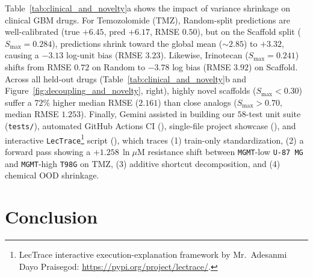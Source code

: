 \documentclass{article}
\begin{document}
Table~\ref{tab:clinical_and_novelty}a shows the impact of variance shrinkage on clinical GBM drugs. For Temozolomide (TMZ), Random-split predictions are well-calibrated (true $+6.45$, pred $+6.17$, RMSE $0.50$), but on the Scaffold split ($S_{\max} = 0.284$), predictions shrink toward the global mean ($\sim 2.85$) to $+3.32$, causing a $-3.13$ log-unit bias (RMSE $3.23$). Likewise, Irinotecan ($S_{\max} = 0.241$) shifts from RMSE $0.72$ on Random to $-3.78$ log bias (RMSE $3.92$) on Scaffold. Across all held-out drugs (Table~\ref{tab:clinical_and_novelty}b and Figure~\ref{fig:decoupling_and_novelty}, right), highly novel scaffolds ($S_{\max} < 0.30$) suffer a $72\%$ higher median RMSE ($2.161$) than close analogs ($S_{\max} > 0.70$, median RMSE $1.253$). Finally, Gemini assisted in building our $58$-test unit suite (\texttt{tests/}), automated GitHub Actions CI (), single-file project showcase (), and interactive \texttt{LecTrace}\footnote{LecTrace interactive execution-explanation framework by Mr.\ Adesanmi Dayo Praisegod: \url{https://pypi.org/project/lectrace/}.} script (), which traces (1) train-only standardization, (2) a forward pass showing a $+1.258\,\ln\mu\text{M}$ resistance shift between \texttt{MGMT}-low \texttt{U-87 MG} and \texttt{MGMT}-high \texttt{T98G} on TMZ, (3) additive shortcut decomposition, and (4) chemical OOD shrinkage.

\section{Conclusion}
\label{sec:conclusion}
\end{document}

